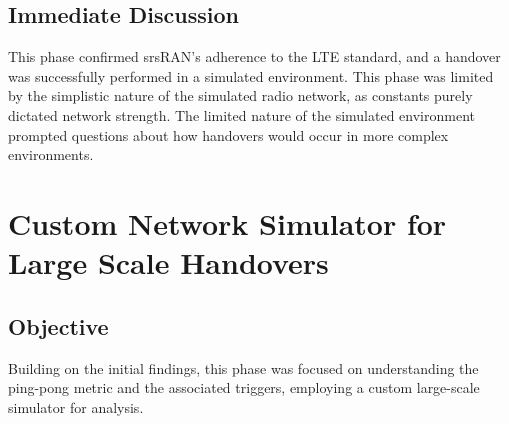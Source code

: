 \subsection{Immediate Discussion}
This phase confirmed srsRAN's adherence to the LTE standard, and a handover was successfully performed in a simulated environment. This phase was limited by the simplistic nature of the simulated radio network, as constants purely dictated network strength. The limited nature of the simulated environment prompted questions about how handovers would occur in more complex environments.

\section{Custom Network Simulator for Large Scale Handovers}
\label{sec:exp:custom}
\subsection{Objective}
Building on the initial findings, this phase was focused on understanding the ping-pong metric and the associated triggers, employing a custom large-scale simulator for analysis.

